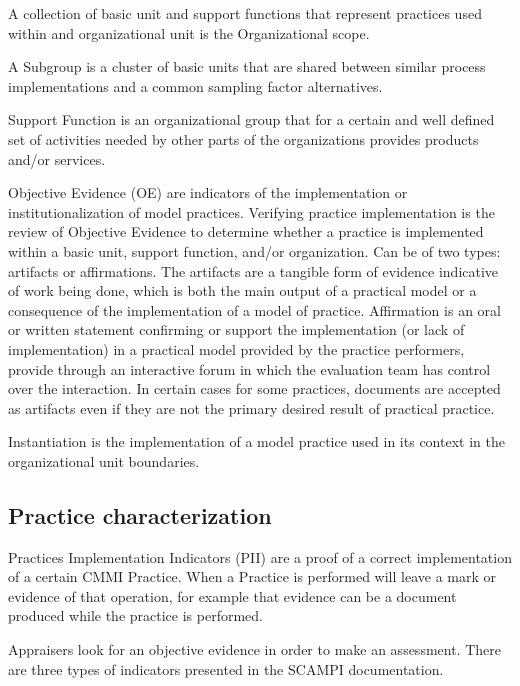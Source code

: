 A collection of basic unit and support functions that represent practices used within and organizational unit is the Organizational scope.


A Subgroup is a cluster of basic units that are shared between similar process implementations and a common sampling factor alternatives.

Support Function is an organizational group that for a certain and well defined set of activities needed by other parts of the organizations provides products and/or services.


Objective Evidence (OE) are indicators of the implementation or institutionalization of model practices. Verifying practice implementation is the review of Objective Evidence to determine whether a practice is implemented within a basic unit, support function, and/or organization. Can be of two types: artifacts or affirmations.
The artifacts are a tangible form of evidence indicative of work being done, which is both the main output of a practical model or a consequence of the implementation of a model of practice.
Affirmation is an oral or written statement confirming or support the implementation (or lack of implementation) in a practical model
provided by the practice performers, provide through an interactive forum in which the evaluation team has control over the
interaction.
In certain cases for some practices, documents are accepted as artifacts even if they are not the primary desired result of practical practice.

Instantiation is the implementation of a model practice used in its context in the organizational unit boundaries.

\subsection{Practice characterization}
Practices Implementation Indicators (PII) are a proof of  a correct implementation of a certain CMMI Practice. When a Practice is performed will leave a mark or evidence of that operation, for example that evidence can be a document produced while the practice is performed.

Appraisers look for an objective evidence in order to make an assessment. There are three types of indicators presented in the SCAMPI documentation.


